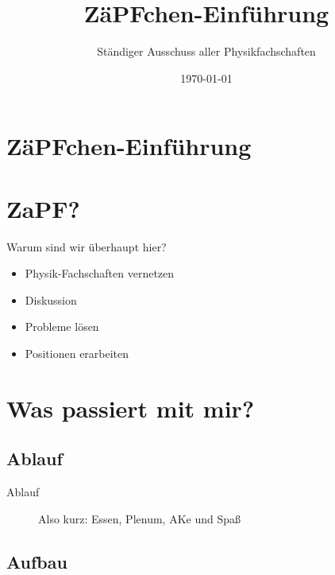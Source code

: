 \documentclass[compress,]{beamer}
\title[ZäPFchen-Einführung]{ZäPFchen-Einführung}
\author{Ständiger Ausschuss aller Physikfachschaften}
\institute[Zusammenkunft aller Physikfachschaften]
\date{\today}
\begin{document}
\begin{frame}
  \titlepage

\end{frame}

\section{ZäPFchen-Einführung}


\section{ZaPF?}

\begin{frame}{Warum sind wir überhaupt hier?}

  \begin{itemize}
  \item Physik-Fachschaften vernetzen
  \item Diskussion
  \item Probleme lösen
  \item Positionen erarbeiten
  \end{itemize}

\end{frame}


\section{Was passiert mit mir?}

\subsection{Ablauf}

\begin{frame}{Ablauf}

  \begin{figure}
    \centering

    \caption{Also kurz: Essen, Plenum, AKe und Spaß}
  \end{figure}

\end{frame}


\subsection{Aufbau}
\end{document}
